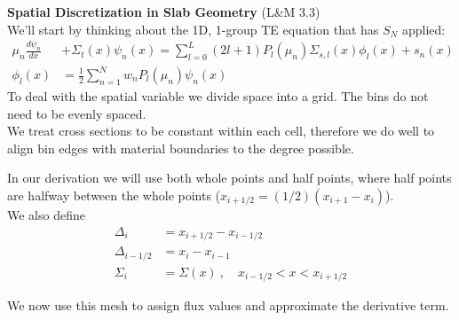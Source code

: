 \documentclass[12pt]{article}
\begin{document}
\textbf{Spatial Discretization in Slab Geometry} (L\&M 3.3)\\
We'll start by thinking about the 1D, 1-group TE equation that has $S_N$ applied:
\begin{align*}
\mu_n \frac{d \psi_n}{dx} &+ \Sigma_t(x) \psi_n(x) = \sum_{l=0}^L (2l+1) P_l(\mu_n) \Sigma_{s,l}(x) \phi_l(x) + s_n(x)\\
\phi_l(x) &= \frac{1}{2}\sum_{n=1}^N w_n P_l(\mu_n) \psi_n(x)
\end{align*}
%
To deal with the spatial variable we divide space into a grid. The bins do not need to be evenly spaced.\\
We treat cross sections to be constant within each cell, therefore we do well to align bin edges with material boundaries to the degree possible. 
%
\begin{center}
\end{center}
%
In our derivation we will use both whole points and half points, where half points are halfway between the whole points ($x_{i+1/2} = (1/2)(x_{i+1} - x_{i})$). \\
We also define
\begin{align*}
\Delta_i &= x_{i+1/2} - x_{i-1/2}\\
\Delta_{i-1/2} &= x_{i} - x_{i-1}\\
\Sigma_i &= \Sigma(x) \:, \quad x_{i-1/2} < x < x_{i+1/2}
\end{align*}

We now use this mesh to assign flux values and approximate the derivative term. 
\end{document}
